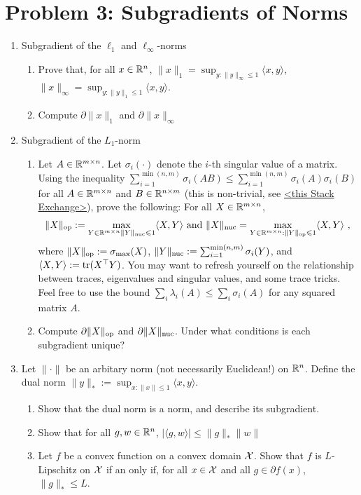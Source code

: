 \documentclass[12pt]{article}
\begin{document}
\section*{Problem 3: Subgradients of Norms}
\begin{enumerate}
\item
Subgradient of the $\ell_1$ and $\ell_{\infty}$-norms
\begin{enumerate}
\item
Prove that, for all $x \in \mathbb{R}^n$, $\|x\|_1 = \sup_{y: \|y\|_{\infty} \le 1}\langle x, y \rangle$, $\|x\|_{\infty} = \sup_{y:\|y\|_1 \le 1}\langle x, y \rangle$. 
\item
Compute $\partial \|x\|_1$ and $\partial \|x\|_{\infty}$
\end{enumerate}
\item 
Subgradient of the $L_1$-norm
\begin{enumerate}
\item
Let $A \in \mathbb{R}^{m \times n}$. Let $\sigma_i(\cdot)$ denote the $i$-th singular value of a matrix. Using the inequality $\sum_{i=1}^{\min(n,m)}\sigma_i(AB) \le \sum_{i=1}^{\min(n,m)} \sigma_i(A)\sigma_i(B)$ for all $A \in \mathbb{R}^{m \times n}$ and $B \in \mathbb{R}^{n \times m}$ (this is non-trivial, see \href{<https://math.stackexchange.com/questions/1648542/proving-holders-inequality-for-schatten-norms>}{<this Stack Exchange>}), prove the following: For all $X \in \mathbb{R}^{m \times n}$, 
\begin{eqnarray}
\|X\|_{\mathrm{op}} :=  \max_{Y \in \mathbb{R}^{m \times n}  \|Y\|_{\mathrm{nuc}} \leqslant 1} \langle X, Y \rangle  \text{ and } \|X\|_{\mathrm{nuc}} =  \max_{Y \in \mathbb{R}^{m \times n} :\|Y\|_{\mathrm{op}} \leqslant 1} \langle X, Y \rangle ~,
\end{eqnarray}
where $\|X\|_{\mathrm{op}} := \sigma_{\max}(X)$, $ \|Y\|_{\mathrm{nuc}} := \sum_{i=1}^{\min(n,m)} \sigma_i(Y)$, and $\langle X, Y \rangle := \mathrm{tr}(X^\top Y)$. You may want to refresh yourself on the relationship between traces, eigenvalues and singular values, and some trace tricks. Feel free to use the bound $\sum_{i} \lambda_i (A) \le \sum_i \sigma_i(A)$ for any squared matrix $A$. 
\item
Compute $\partial \|X\|_{\mathrm{op}}$ and $\partial \|X\|_{\mathrm{nuc}}$. Under what conditions is each subgradient unique?
\end{enumerate}
\item 
Let  $\|\cdot\|$ be an arbitary norm (not necessarily Euclidean!)
on $\mathbb{R}^n$. Define the dual norm $\|y\|_* := \sup_{x: \|x\| \le 1}\langle x,y \rangle$. 
\begin{enumerate}
\item
Show that the dual norm is a norm, and describe its subgradient.
\item Show that for all $g,w \in \mathbb{R}^n$, $|\langle g, w \rangle| \le \|g\|_*\|w\|$
\item
Let $f$ be a convex function on a convex domain ${\cal X}$. Show that $f$ is $L$-Lipschitz on ${\cal X}$ if an only if, for all $x \in {\cal X}$ and all $g \in \partial f(x)$, $\|g\|_{*} \le L$.
\end{enumerate}
\end{enumerate}
\end{document}
